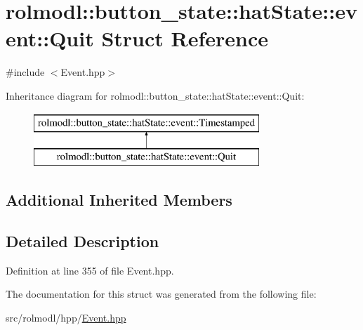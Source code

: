 \hypertarget{structrolmodl_1_1button__state_1_1hat_state_1_1event_1_1_quit}{}\section{rolmodl\+::button\+\_\+state\+::hat\+State\+::event\+::Quit Struct Reference}
\label{structrolmodl_1_1button__state_1_1hat_state_1_1event_1_1_quit}


{\ttfamily \#include $<$Event.\+hpp$>$}

Inheritance diagram for rolmodl\+::button\+\_\+state\+::hat\+State\+::event\+::Quit\+:\begin{figure}[H]
\begin{center}
\leavevmode
\includegraphics[height=2.000000cm]{structrolmodl_1_1button__state_1_1hat_state_1_1event_1_1_quit}
\end{center}
\end{figure}
\subsection*{Additional Inherited Members}


\subsection{Detailed Description}


Definition at line 355 of file Event.\+hpp.



The documentation for this struct was generated from the following file\+:\begin{DoxyCompactItemize}
\item 
src/rolmodl/hpp/\mbox{\hyperlink{_event_8hpp}{Event.\+hpp}}\end{DoxyCompactItemize}
